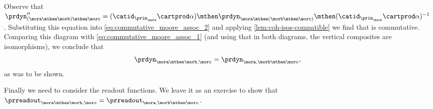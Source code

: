Observe that $\prdyn''_{(\mora \mthen \morb) \mthen \morc} =  (\catid_{\prin_{\mora}} \cartprod \alpha) \mthen \prdyn_{\mora \mthen (\morb \mthen \morc)} \mthen (\catid_{\prin_{\mora}} \cartprod \alpha)^{-1}$. Substituting this equation into \cref{eq:commutative_moore_assoc_2} and applying \cref{lem:coh-isos-compatible} we find that
is commutative. Comparing this diagram with \cref{eq:commutative_moore_assoc_1} (and using that in both diagrams, the vertical composites are isomorphisms), we conclude that
\begin{equation*}
\prdyn_{\mora \mthen \morb, \morc} = \prdyn_{\mora, \morb \mthen \morc},
\end{equation*}
as was to be shown.



    Finally we need to consider the readout functions. We leave it as an exercise to show that $\prreadout_{\mora \mthen \morb, \morc} = \prreadout_{\mora, \morb \mthen \morc}$.


%



